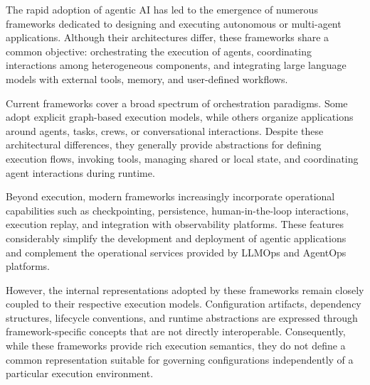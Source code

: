 \documentclass[10pt]{article}
\begin{document}
The rapid adoption of agentic AI has led to the emergence of numerous frameworks dedicated to designing and executing autonomous or multi-agent applications. Although their architectures differ, these frameworks share a common objective: orchestrating the execution of agents, coordinating interactions among heterogeneous components, and integrating large language models with external tools, memory, and user-defined workflows.

Current frameworks cover a broad spectrum of orchestration paradigms. Some adopt explicit graph-based execution models, while others organize applications around agents, tasks, crews, or conversational interactions. Despite these architectural differences, they generally provide abstractions for defining execution flows, invoking tools, managing shared or local state, and coordinating agent interactions during runtime.

Beyond execution, modern frameworks increasingly incorporate operational capabilities such as checkpointing, persistence, human-in-the-loop interactions, execution replay, and integration with observability platforms. These features considerably simplify the development and deployment of agentic applications and complement the operational services provided by LLMOps and AgentOps platforms.

However, the internal representations adopted by these frameworks remain closely coupled to their respective execution models. Configuration artifacts, dependency structures, lifecycle conventions, and runtime abstractions are expressed through framework-specific concepts that are not directly interoperable. Consequently, while these frameworks provide rich execution semantics, they do not define a common representation suitable for governing configurations independently of a particular execution environment.
\end{document}
